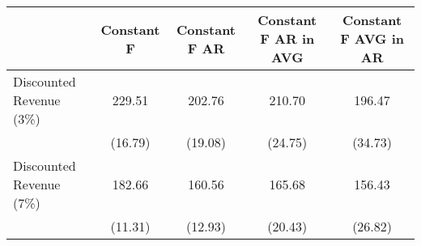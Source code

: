 \begin{tabular}{l*{4}{c}}
\hline\hline
                    &  Constant F&Constant F AR&Constant F AR in AVG&Constant F AVG in AR\\
\hline
Discounted Revenue (3\%)&      229.51&      202.76&      210.70&      196.47\\
                    &     (16.79)&     (19.08)&     (24.75)&     (34.73)\\
Discounted Revenue (7\%)&      182.66&      160.56&      165.68&      156.43\\
                    &     (11.31)&     (12.93)&     (20.43)&     (26.82)\\
\hline\hline
\end{tabular}
